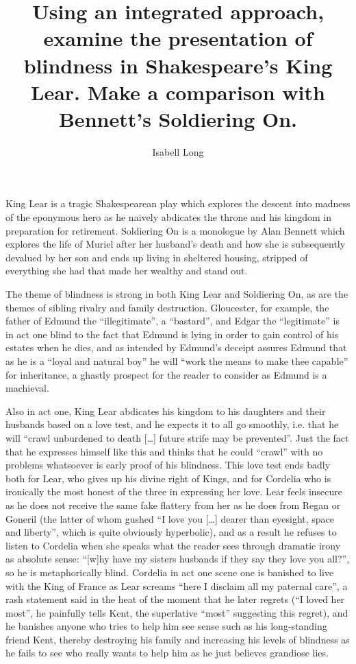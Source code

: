 \documentclass[a4paper]{article}
\begin{document}
\title{Using an integrated approach, examine the presentation of blindness in Shakespeare's King Lear. Make a comparison with Bennett's Soldiering On.}
\author{Isabell Long}
\maketitle

King Lear is a tragic Shakespearean play which explores the descent into madness of the eponymous hero as he naively abdicates the throne and his kingdom in preparation for retirement. Soldiering On is a monologue by Alan Bennett which explores the life of Muriel after her husband's death and how she is subsequently devalued by her son and ends up living in sheltered housing, stripped of everything she had that made her wealthy and stand out.

The theme of blindness is strong in both King Lear and Soldiering On, as are the themes of sibling rivalry and family destruction.  Gloucester, for example, the father of Edmund the ``illegitimate'', a ``bastard'', and Edgar the ``legitimate'' is in act one blind to the fact that Edmund is lying in order to gain control of his estates when he dies, and as intended by Edmund's deceipt assures Edmund that as he is a ``loyal and natural boy'' he will ``work the means to make thee capable'' for inheritance, a ghastly prospect for the reader to consider as Edmund is a machieval.

Also in act one, King Lear abdicates his kingdom to his daughters and their husbands based on a love test, and he expects it to all go smoothly, i.e. that he will ``crawl unburdened to death [\ldots] future strife may be prevented''. Just the fact that he expresses himself like this and thinks that he could ``crawl'' with no problems whatsoever is early proof of his blindness. This love test ends badly both for Lear, who gives up his divine right of Kings, and for Cordelia who is ironically the most honest of the three in expressing her love. Lear feels insecure as he does not receive the same fake flattery from her as he does from Regan or Goneril (the latter of whom gushed ``I love you [\ldots] dearer than eyesight, space and liberty'', which is quite obviously hyperbolic), and as a result he refuses to listen to Cordelia when she speaks what the reader sees through dramatic irony as absolute sense: ``[w]hy have my sisters husbands if they say they love you all?'', so he is metaphorically blind. Cordelia in act one scene one is banished to live with the King of France as Lear screams ``here I disclaim all my paternal care'', a rash statement said in the heat of the moment that he later regrets (``I loved her most'', he painfully tells Kent, the superlative ``most'' suggesting this regret), and he banishes anyone who tries to help him see sense such as his long-standing friend Kent, thereby destroying his family and increasing his levels of blindness as he fails to see who really wants to help him as he just believes grandiose lies.
\end{document}
